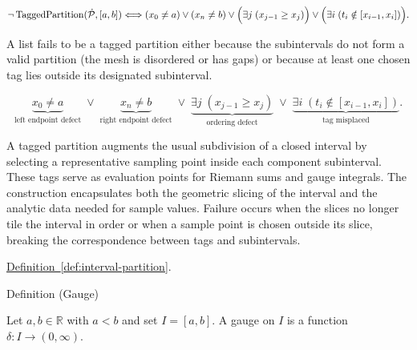 \begin{remark*}
\[
\neg\operatorname{TaggedPartition}(\dot{\mathcal{P}},[a,b])
\Longleftrightarrow
(x_0\ne a)\lor(x_n\ne b)\lor
\Bigl(\exists j\;(x_{j-1} \ge x_j)\Bigr) \lor \Bigl(\exists i\;(t_i \notin [x_{i-1},x_i])\Bigr).
\]
\end{remark*}

\begin{remark*}
A list fails to be a tagged partition either because the subintervals do not form a valid partition (the mesh is disordered or has gaps) or because at least one chosen tag lies outside its designated subinterval.
\end{remark*}

\begin{remark*}
\[
\underbrace{x_0\ne a}_{\text{left endpoint defect}}
\;\lor\;
\underbrace{x_n\ne b}_{\text{right endpoint defect}}
\;\lor\;
\underbrace{\exists j\;(x_{j-1} \ge x_j)}_{\text{ordering defect}}
\;\lor\;
\underbrace{\exists i\;(t_i \notin [x_{i-1},x_i])}_{\text{tag misplaced}}.
\]
\end{remark*}

\begin{remark*}[Interpretation]
A tagged partition augments the usual subdivision of a closed interval by selecting a representative sampling point inside each component subinterval. These tags serve as evaluation points for Riemann sums and gauge integrals. The construction encapsulates both the geometric slicing of the interval and the analytic data needed for sample values. Failure occurs when the slices no longer tile the interval in order or when a sample point is chosen outside its slice, breaking the correspondence between tags and subintervals.
\end{remark*}

\begin{dependencies}
\hyperref[def:interval-partition]{Definition~\ref*{def:interval-partition}}.
\end{dependencies}


\begin{definitionbox}{Definition (Gauge)}
\begin{definition}[Gauge]
\label{def:gauge}
Let $a,b \in \mathbb{R}$ with $a<b$ and set $I=[a,b]$. A gauge on $I$ is a function $\delta:I\to(0,\infty)$.
\end{definition}
\end{definitionbox}

